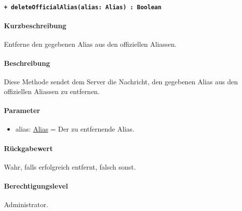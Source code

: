 \paragraph{\texttt{+ deleteOfficialAlias(alias: Alias) : Boolean}}\label{AP_Backend_deleteOfficialAlias}%
\paragraph*{Kurzbeschreibung}
Entferne den gegebenen Alias aus den offiziellen Aliassen.
\paragraph*{Beschreibung}
Diese Methode sendet dem Server die Nachricht, den gegebenen Alias aus den offiziellen Aliassen zu entfernen.
\paragraph*{Parameter}
\begin{itemize}
    \item alias: \hyperref[AP_Alias]{Alias} = Der zu entfernende Alias.
\end{itemize}
\paragraph*{Rückgabewert}
Wahr, falls erfolgreich entfernt, falsch sonst.
\paragraph*{Berechtigungslevel}
Administrator.